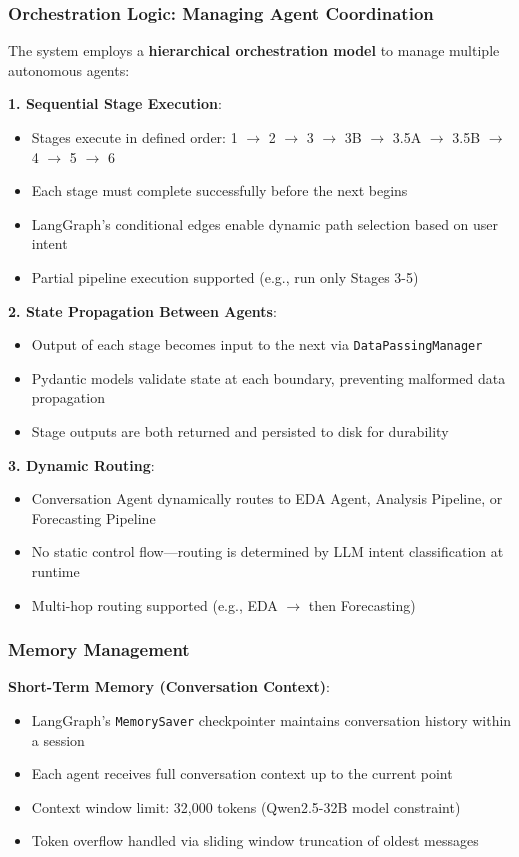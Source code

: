 \documentclass[11pt,a4paper]{article}
\begin{document}
\subsubsection{Orchestration Logic: Managing Agent Coordination}

The system employs a \textbf{hierarchical orchestration model} to manage multiple autonomous agents:

\textbf{1. Sequential Stage Execution}:
\begin{itemize}
    \item Stages execute in defined order: 1 $\rightarrow$ 2 $\rightarrow$ 3 $\rightarrow$ 3B $\rightarrow$ 3.5A $\rightarrow$ 3.5B $\rightarrow$ 4 $\rightarrow$ 5 $\rightarrow$ 6
    \item Each stage must complete successfully before the next begins
    \item LangGraph's conditional edges enable dynamic path selection based on user intent
    \item Partial pipeline execution supported (e.g., run only Stages 3-5)
\end{itemize}

\textbf{2. State Propagation Between Agents}:
\begin{itemize}
    \item Output of each stage becomes input to the next via \texttt{DataPassingManager}
    \item Pydantic models validate state at each boundary, preventing malformed data propagation
    \item Stage outputs are both returned and persisted to disk for durability
\end{itemize}

\textbf{3. Dynamic Routing}:
\begin{itemize}
    \item Conversation Agent dynamically routes to EDA Agent, Analysis Pipeline, or Forecasting Pipeline
    \item No static control flow---routing is determined by LLM intent classification at runtime
    \item Multi-hop routing supported (e.g., EDA $\rightarrow$ then Forecasting)
\end{itemize}

\subsubsection{Memory Management}

\textbf{Short-Term Memory (Conversation Context)}:
\begin{itemize}
    \item LangGraph's \texttt{MemorySaver} checkpointer maintains conversation history within a session
    \item Each agent receives full conversation context up to the current point
    \item Context window limit: 32,000 tokens (Qwen2.5-32B model constraint)
    \item Token overflow handled via sliding window truncation of oldest messages
\end{itemize}
\end{document}
